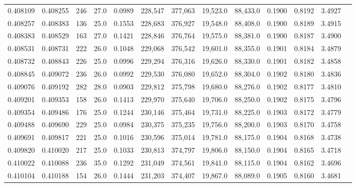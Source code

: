 \begin{tabular}{rrrrrrrrrrrrr}
0.408109 & 0.408255 &   246 & 27.0 &                                     0.0989 & 228,547 & 377,063 &  19,523.0 &  88,433.0 & 0.1900 & 0.8192 & 3.4927 \\
0.408257 & 0.408383 &   136 & 25.0 &                                     0.1553 & 228,683 & 376,927 &  19,548.0 &  88,408.0 & 0.1900 & 0.8189 & 3.4915 \\
0.408383 & 0.408529 &   163 & 27.0 &                                     0.1421 & 228,846 & 376,764 &  19,575.0 &  88,381.0 & 0.1900 & 0.8187 & 3.4900 \\
0.408531 & 0.408731 &   222 & 26.0 &                                     0.1048 & 229,068 & 376,542 &  19,601.0 &  88,355.0 & 0.1901 & 0.8184 & 3.4879 \\
0.408732 & 0.408843 &   226 & 25.0 &                                     0.0996 & 229,294 & 376,316 &  19,626.0 &  88,330.0 & 0.1901 & 0.8182 & 3.4858 \\
0.408845 & 0.409072 &   236 & 26.0 &                                     0.0992 & 229,530 & 376,080 &  19,652.0 &  88,304.0 & 0.1902 & 0.8180 & 3.4836 \\
0.409076 & 0.409192 &   282 & 28.0 &                                     0.0903 & 229,812 & 375,798 &  19,680.0 &  88,276.0 & 0.1902 & 0.8177 & 3.4810 \\
0.409201 & 0.409353 &   158 & 26.0 &                                     0.1413 & 229,970 & 375,640 &  19,706.0 &  88,250.0 & 0.1902 & 0.8175 & 3.4796 \\
0.409354 & 0.409486 &   176 & 25.0 &                                     0.1244 & 230,146 & 375,464 &  19,731.0 &  88,225.0 & 0.1903 & 0.8172 & 3.4779 \\
0.409488 & 0.409690 &   229 & 25.0 &                                     0.0984 & 230,375 & 375,235 &  19,756.0 &  88,200.0 & 0.1903 & 0.8170 & 3.4758 \\
0.409691 & 0.409817 &   221 & 25.0 &                                     0.1016 & 230,596 & 375,014 &  19,781.0 &  88,175.0 & 0.1904 & 0.8168 & 3.4738 \\
0.409820 & 0.410020 &   217 & 25.0 &                                     0.1033 & 230,813 & 374,797 &  19,806.0 &  88,150.0 & 0.1904 & 0.8165 & 3.4718 \\
0.410022 & 0.410088 &   236 & 35.0 &                                     0.1292 & 231,049 & 374,561 &  19,841.0 &  88,115.0 & 0.1904 & 0.8162 & 3.4696 \\
0.410104 & 0.410188 &   154 & 26.0 &                                     0.1444 & 231,203 & 374,407 &  19,867.0 &  88,089.0 & 0.1905 & 0.8160 & 3.4681 \\

\end{tabular}
